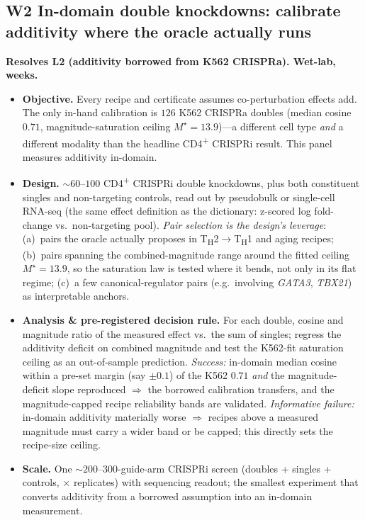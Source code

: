 \documentclass[11pt]{article}
\newcommand{\Th}[1]{T\textsubscript{H}#1}
\newcommand{\sev}[2]{\textcolor{#1}{\textbf{#2}}}
\begin{document}
\subsection{W2 \quad In-domain double knockdowns: calibrate additivity where the oracle actually runs}
\sev{sev1}{Resolves L2 (additivity borrowed from K562 CRISPRa). Wet-lab, weeks.}
\begin{itemize}
\item[] \textbf{Objective.} Every recipe and certificate assumes co-perturbation effects add. The
only in-hand calibration is $126$ K562 CRISPRa doubles (median cosine $0.71$, magnitude-saturation
ceiling $M^{\star}\!=\!13.9$)---a different cell type \emph{and} a different modality than the
headline CD4\textsuperscript{+} CRISPRi result. This panel measures additivity in-domain.
\item[] \textbf{Design.} $\sim\!60$--$100$ CD4\textsuperscript{+} CRISPRi double knockdowns, plus
both constituent singles and non-targeting controls, read out by pseudobulk or single-cell RNA-seq
(the same effect definition as the dictionary: z-scored log fold-change vs.\ non-targeting pool).
\emph{Pair selection is the design's leverage}: (a)~pairs the oracle actually proposes in
\Th{2}$\rightarrow$\Th{1} and aging recipes; (b)~pairs spanning the combined-magnitude range around
the fitted ceiling $M^{\star}\!=\!13.9$, so the saturation law is tested where it bends, not only
in its flat regime; (c)~a few canonical-regulator pairs (e.g.\ involving \emph{GATA3},
\emph{TBX21}) as interpretable anchors.
\item[] \textbf{Analysis \& pre-registered decision rule.} For each double, cosine and magnitude
ratio of the measured effect vs.\ the sum of singles; regress the additivity deficit on combined
magnitude and test the K562-fit saturation ceiling as an out-of-sample prediction.
\emph{Success:} in-domain median cosine within a pre-set margin (say $\pm0.1$) of the K562 $0.71$
\emph{and} the magnitude-deficit slope reproduced $\Rightarrow$ the borrowed calibration transfers,
and the magnitude-capped recipe reliability bands are validated. \emph{Informative failure:}
in-domain additivity materially worse $\Rightarrow$ recipes above a measured magnitude must carry a
wider band or be capped; this directly sets the recipe-size ceiling.
\item[] \textbf{Scale.} One $\sim\!200$--$300$-guide-arm CRISPRi screen (doubles + singles +
controls, $\times$ replicates) with sequencing readout; the smallest experiment that converts
additivity from a borrowed assumption into an in-domain measurement.
\end{itemize}
\end{document}
